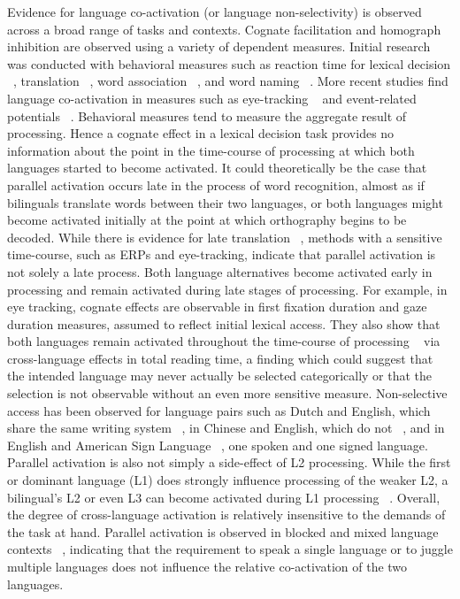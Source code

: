 Evidence for language co-activation (or language non-selectivity) is observed across a broad range of tasks and contexts. Cognate facilitation and homograph inhibition are observed using a variety of dependent measures. Initial research was conducted with behavioral measures such as reaction time for lexical decision ~\citep{Dijkstra1998, VanHell2008, VanHell2002}, translation ~\citep{VanHell2008, Sachez-Casas1992}, word association ~\citep{VanHell2002}, and word naming ~\citep{Schwartz2006, Schwartz2007}. More recent studies find language co-activation in measures such as eye-tracking ~\citep{Duyck2007, Libben2009, Titone2011, VanAssche2010,VanAssche2009} and event-related potentials ~\citep[ERPs;][]{Midgley2011}. Behavioral measures tend to measure the aggregate result of processing. Hence a cognate effect in a lexical decision task provides no information about the point in the time-course of processing at which both languages started to become activated. It could theoretically be the case that parallel activation occurs late in the process of word recognition, almost as if bilinguals translate words between their two languages, or both languages might become activated initially at the point at which orthography begins to be decoded. While there is evidence for late translation ~\citep[e.g.,][]{Thierry2007}, methods with a sensitive time-course, such as ERPs and eye-tracking, indicate that parallel activation is not solely a late process. Both language alternatives become activated early in processing and remain activated during late stages of processing. For example, in eye tracking, cognate effects are observable in first fixation duration and gaze duration measures, assumed to reflect initial lexical access. They also show that both languages remain activated throughout the time-course of processing ~\citep{Duyck2007, Libben2009, Titone2011, VanAssche2010,VanAssche2009} via cross-language effects in total reading time, a finding which could suggest that the intended language may never actually be selected categorically or that the selection is not observable without an even more sensitive measure. Non-selective access has been observed for language pairs such as Dutch and English, which share the same writing system ~\citep[e.g.,][]{Duyck2007}, in Chinese and English, which do not ~\citep[e.g.,][]{Thierry2007}, and in English and American Sign Language ~\citep[e.g.,][]{Morford2011}, one spoken and one signed language. Parallel activation is also not simply a side-effect of L2 processing. While the first or dominant language (L1) does strongly influence processing of the weaker L2, a bilingual's L2 or even L3 can become activated during L1 processing ~\citep[e.g.,][]{VanAssche2009, VanHell2002}. Overall, the degree of cross-language activation is relatively insensitive to the demands of the task at hand. Parallel activation is observed in blocked and mixed language contexts ~\citep[e.g.,][]{Gullifer2013}, indicating that the requirement to speak a single language or to juggle multiple languages does not influence the relative co-activation of the two languages.

